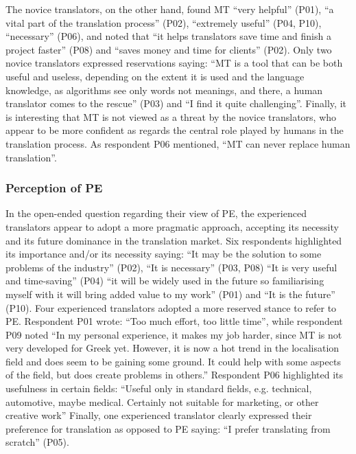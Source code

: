 \documentclass[output=paper]{langscibook}
\begin{document}
The novice translators, on the other hand, found MT “very helpful” (P01), “a vital part of the translation process” (P02), “extremely useful” (P04, P10), “necessary” (P06), and noted that “it helps translators save time and finish a project faster” (P08) and “saves money and time for clients” (P02). Only two novice translators expressed reservations saying: “MT is a tool that can be both useful and useless, depending on the extent it is used and the language knowledge, as algorithms see only words not meanings, and there, a human translator comes to the rescue” (P03) and “I find it quite challenging”. Finally, it is interesting that MT is not viewed as a threat by the novice translators, who appear to be more confident as regards the central role played by humans in the translation process. As respondent P06 mentioned, “MT can never replace human translation”.

\subsubsection{Perception of PE}\largerpage
In the open-ended question regarding their view of PE, the experienced translators appear to adopt a more pragmatic approach, accepting its necessity and its future dominance in the translation market. Six respondents highlighted its importance and/or its necessity saying: “It may be the solution to some problems of the industry” (P02), “It is necessary” (P03, P08) “It is very useful and time-saving” (P04) “it will be widely used in the future so familiarising myself with it will bring added value to my work” (P01) and “It is the future” (P10). Four experienced translators adopted a more reserved stance to refer to PE. Respondent P01 wrote: “Too much effort, too little time”, while respondent P09 noted “In my personal experience, it makes my job harder, since MT is not very developed for Greek yet. However, it is now a hot trend in the localisation field and does seem to be gaining some ground. It could help with some aspects of the field, but does create problems in others.” Respondent P06 highlighted its usefulness in certain fields: “Useful only in standard fields, e.g. technical, automotive, maybe medical. Certainly not suitable for marketing, or other creative work” Finally, one experienced translator clearly expressed their preference for translation as opposed to PE saying: “I prefer translating from scratch” (P05). 
\end{document}
